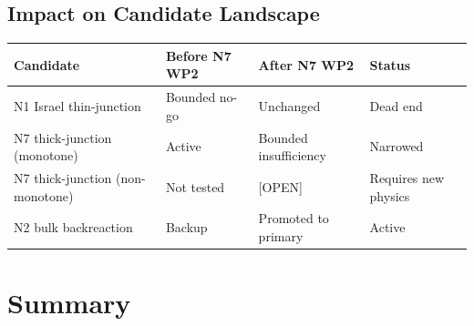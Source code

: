 \subsection{Impact on Candidate Landscape}

\begin{center}
\begin{tabular}{llll}
\toprule
\textbf{Candidate} & \textbf{Before N7 WP2} & \textbf{After N7 WP2}
& \textbf{Status} \\
\midrule
N1 Israel thin-junction & Bounded no-go & Unchanged & Dead end \\
N7 thick-junction (monotone) & Active & Bounded insufficiency
& Narrowed \\
N7 thick-junction (non-monotone) & Not tested & [OPEN] & Requires
new physics \\
N2 bulk backreaction & Backup & Promoted to primary & Active \\
\bottomrule
\end{tabular}
\end{center}

\section{Summary}
\label{sec:P2N7:summary}

